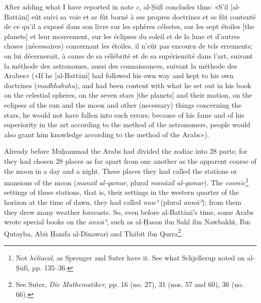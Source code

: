 \documentclass[11pt]{article}
\newcommand{\Pg}[1]{\marginpar{\footnotesize\color{gray}#1}}
\begin{document}
\par After adding what I have reported in note \emph{c}, al-Ṣūfī concludes thus: «S’il [al-Battānī] eût suivi sa voie et se fût borné à ses propres doctrines  et se fût contenté de ce qu’il a exposé dans son livre sur les sphères célestes, sur les sept étoiles [the planets] et leur mouvement, sur les éclipses du soleil et de la lune et d’autres choses (nécessaires) concernant les étoiles, il n’eût pas encouru de tels errements; on lui décernerait, à cause de sa célébrité et de sa supérieurité dans l’art, suivant la méthode des astronomes, aussi des connaissances, suivant la méthode des Arabes» («If he [al-Battānī] had followed his own way and kept to his own doctrines (\emph{madhhabuhu}), and had been content with what he set out in his book on the celestial spheres, on the seven stars [the planets] and their motion, on the eclipses of the sun and the moon and other (necessary) things concerning the stars, he would not have fallen into such errors; because of his fame and of his superiority in the art according to the method of the astronomers, people would also grant him knowledge according to the method of the Arabs»).\par
\par \Pg{I 297}Already before Muḥammad the Arabs had divided the zodiac into 28 parts; for they had chosen 28 places as far apart from one another as the apparent course of the moon in a day and a night. These places they had called the stations or mansions of the moon (\emph{manzil al-qamar}, plural \emph{manāzil al-qamar}). The \emph{cosmic}\footnote{Not \emph{heliacal}, as Sprenger and Suter have it. See what Schjellerup noted on al-Ṣūfī, pp. 135–36.} settings of these stations, that is, their settings in the western quarter of the horizon at the time of dawn, they had called \emph{nawʾ} (plural \emph{anwāʾ}); from them they drew many weather forecasts. So, even before al-Battānī's time, some Arabs wrote special books on the \emph{anwāʾ}, such as al-Ḥasan ibn Sahl ibn Nawbakht, Ibn Qutayba, Abū Ḥanīfa al-Dīnawarī and Thābit ibn Qurra\footnote{See Suter, \emph{Die Mathematiker}, pp. 16 (no. 27), 31 (nos. 57 and 60), 36 (no. 66).}.\par
\end{document}
